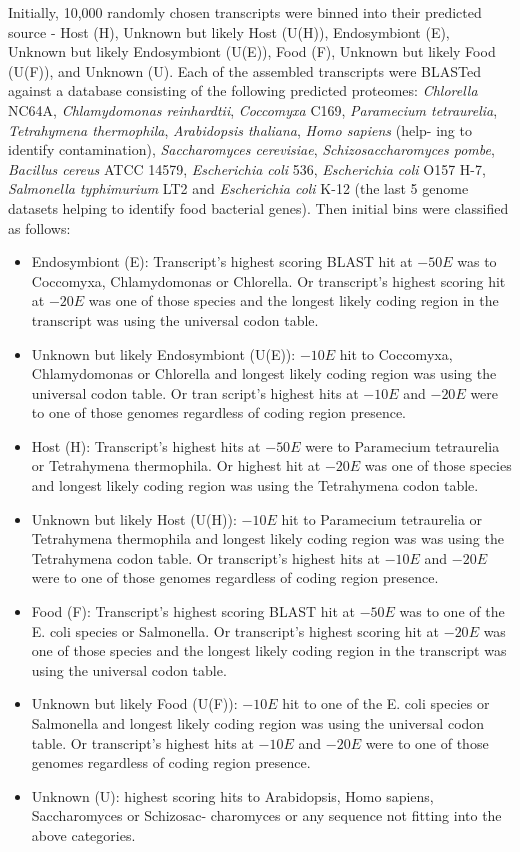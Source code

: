 Initially, 10,000 randomly chosen transcripts were binned into their predicted source - 
Host (H), Unknown but likely Host (U(H)), Endosymbiont (E), Unknown but likely Endosymbiont (U(E)), Food (F), Unknown but likely Food (U(F)), and
Unknown (U). 
Each of the assembled transcripts were BLASTed against a database consisting of the following predicted proteomes: 
\textit{Chlorella} NC64A, \textit{Chlamydomonas reinhardtii}, \textit{Coccomyxa} C169,
\textit{Paramecium tetraurelia}, \textit{Tetrahymena thermophila}, \textit{Arabidopsis thaliana}, \textit{Homo sapiens} (help-
    ing to identify contamination), \textit{Saccharomyces cerevisiae}, \textit{Schizosaccharomyces pombe}, \textit{Bacillus
cereus} ATCC 14579, \textit{Escherichia coli} 536, \textit{Escherichia coli} O157 H-7, \textit{Salmonella typhimurium}
LT2 and \textit{Escherichia coli} K-12 (the last 5 genome datasets helping to identify food bacterial
genes). Then initial bins were classified as follows:
\begin{itemize}
    \item Endosymbiont (E): Transcript’s highest scoring BLAST hit at \(-50E\) was to Coccomyxa,
        Chlamydomonas or Chlorella. Or transcript’s highest scoring hit at \(-20E\) was one of those
species and the longest likely coding region in the transcript was using the universal codon
table.
\item Unknown but likely Endosymbiont (U(E)): \(-10E\) hit to Coccomyxa, Chlamydomonas or
Chlorella and longest likely coding region was using the universal codon table. Or tran
script’s highest hits at \(-10E\) and \(-20E\) were to one of those genomes regardless of coding
region presence.
\item Host (H): Transcript’s highest hits at \(-50E\) were to Paramecium tetraurelia or Tetrahymena
    thermophila. Or highest hit at \(-20E\) was one of those species and longest likely coding
region was using the Tetrahymena codon table.
\item Unknown but likely Host (U(H)): \(-10E\) hit to Paramecium tetraurelia or Tetrahymena
thermophila and longest likely coding region was was using the Tetrahymena codon table.
Or transcript’s highest hits at \(-10E\) and \(-20E\) were to one of those genomes regardless of
coding region presence.
\item Food (F): Transcript’s highest scoring BLAST hit at \(-50E\) was to one of the E. coli species
    or Salmonella. Or transcript’s highest scoring hit at \(-20E\) was one of those species and
the longest likely coding region in the transcript was using the universal codon table.
\item Unknown but likely Food (U(F)): \(-10E\) hit to one of the E. coli species or Salmonella and
longest likely coding region was using the universal codon table. Or transcript’s highest
hits at \(-10E\) and \(-20E\) were to one of those genomes regardless of coding region presence.
\item Unknown (U): highest scoring hits to Arabidopsis, Homo sapiens, Saccharomyces or Schizosac-
charomyces or any sequence not fitting into the above categories.
\end{itemize}

